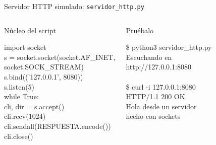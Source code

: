 \documentclass[aspectratio=169,10pt,c]{beamer}
\begin{document}
\begin{frame}{Servidor HTTP simulado: \texttt{servidor\_http.py}}
\begin{columns}[T,onlytextwidth]
\begin{exampleblock}{Núcleo del script}
\begin{terminal}\scriptsize
import socket\\
s = socket.socket(socket.AF\_INET,\\
\quad socket.SOCK\_STREAM)\\
s.bind(('127.0.0.1', 8080))\\
s.listen(5)\\
while True:\\
\quad cli, dir = s.accept()\\
\quad cli.recv(1024)\\
\quad cli.sendall(RESPUESTA.encode())\\
\quad cli.close()
\end{terminal}
\end{exampleblock}
\begin{exampleblock}{Pruébalo}
\begin{terminal}\footnotesize
\$ python3 servidor\_http.py\\
Escuchando en \\
http://127.0.0.1:8080\\
~\\
\$ curl -i 127.0.0.1:8080\\
HTTP/1.1 200 OK\\
Hola desde un servidor\\
hecho con sockets
\end{terminal}
\end{exampleblock}
\end{columns}
\end{frame}
\end{document}
